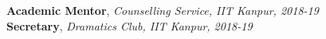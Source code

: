


  \textbf{Academic Mentor},\small\emph{ Counselling Service, IIT Kanpur, 2018-19}\\
\vspace{0.05cm}
 \normalsize \textbf{Secretary},\small\emph{ Dramatics Club, IIT Kanpur, 2018-19}

\vspace{-2mm}
